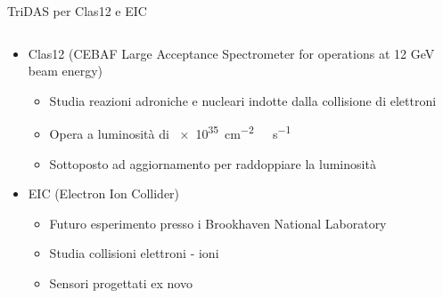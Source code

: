 \documentclass[aspectratio=169]{beamer}
\begin{document}
  \begin{frame}{TriDAS per Clas12 e EIC}
      \begin{columns}[onlytextwidth,T]
      \begin{column}{.60\linewidth}
      \begin{itemize}
          \item Clas12 (CEBAF Large Acceptance Spectrometer for operations at 12 GeV beam energy)
             \begin{itemize}
                \item Studia reazioni adroniche e nucleari indotte dalla collisione di elettroni
                \item Opera a luminosità di \SI{e35}{cm^{-2}\ s^{-1}}
                \item Sottoposto ad aggiornamento per raddoppiare la luminosità
             \end{itemize}
         \item EIC (Electron Ion Collider)
             \begin{itemize}
                 \item Futuro esperimento presso i Brookhaven National Laboratory
                 \item Studia collisioni elettroni - ioni
                 \item Sensori progettati ex novo
             \end{itemize}
      \end{itemize}
      \end{column}
      \begin{column}{.45\linewidth}
      \end{column}
    \end{columns}
  \end{frame}
\end{document}
